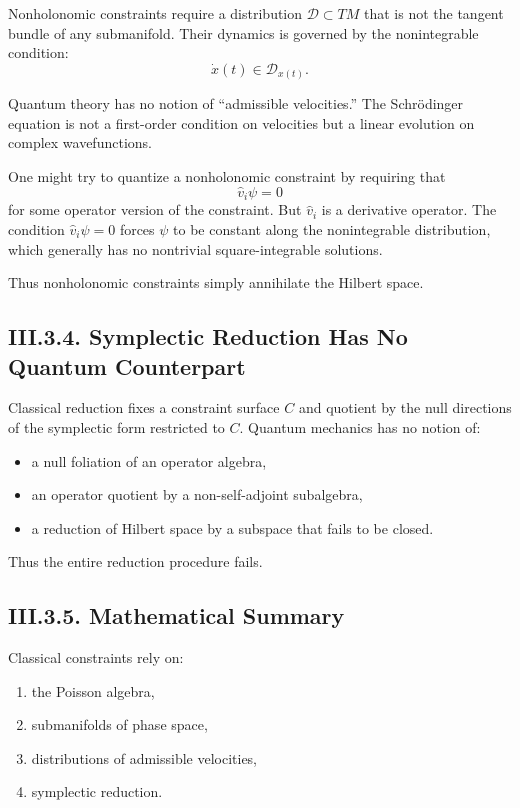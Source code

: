 \documentclass[12pt,oneside]{book}
\theoremstyle{plain}
\theoremstyle{definition}
\begin{document}
Nonholonomic constraints require a distribution $\mathcal{D}\subset TM$ that is
not the tangent bundle of any submanifold. Their dynamics is governed by the
nonintegrable condition:
\[
\dot{x}(t) \in \mathcal{D}_{x(t)}.
\]

Quantum theory has no notion of “admissible velocities.” The Schrödinger
equation is not a first-order condition on velocities but a linear evolution
on complex wavefunctions.

One might try to quantize a nonholonomic constraint by requiring that
\[
\widehat{v}_i \psi = 0
\]
for some operator version of the constraint. But $\widehat{v}_i$ is a
derivative operator. The condition $\widehat{v}_i\psi=0$ forces $\psi$ to be
constant along the nonintegrable distribution, which generally has no
nontrivial square-integrable solutions.

Thus nonholonomic constraints simply annihilate the Hilbert space.

\subsection*{III.3.4. Symplectic Reduction Has No Quantum Counterpart}

Classical reduction fixes a constraint surface $C$ and quotient by the null
directions of the symplectic form restricted to $C$. Quantum mechanics has no
notion of:

\begin{itemize}
    \item a null foliation of an operator algebra,
    \item an operator quotient by a non-self-adjoint subalgebra,
    \item a reduction of Hilbert space by a subspace that fails to be closed.
\end{itemize}

Thus the entire reduction procedure fails.

\subsection*{III.3.5. Mathematical Summary}

Classical constraints rely on:

\begin{enumerate}
    \item the Poisson algebra,
    \item submanifolds of phase space,
    \item distributions of admissible velocities,
    \item symplectic reduction.
\end{enumerate}
\end{document}
